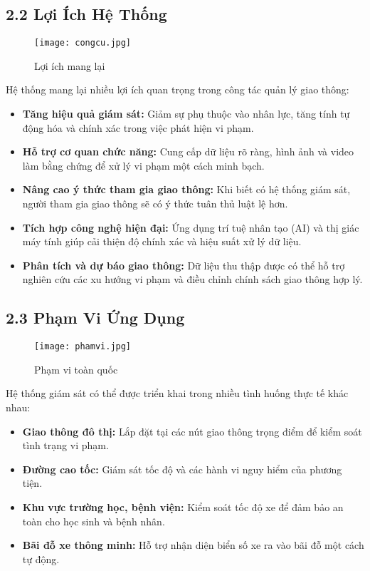 \documentclass[conference]{IEEEtran}
\begin{document}
\subsection{2.2 Lợi Ích Hệ Thống}
\begin{figure}[H]
    \centering
    \texttt{[image: congcu.jpg]} %
    \caption{Lợi ích mang lại}
    \label{fig:traffic_monitoring}
\end{figure}
Hệ thống mang lại nhiều lợi ích quan trọng trong công tác quản lý giao thông:
\begin{itemize}
    \item \textbf{Tăng hiệu quả giám sát:} Giảm sự phụ thuộc vào nhân lực, tăng tính tự động hóa và chính xác trong việc phát hiện vi phạm.
    \item \textbf{Hỗ trợ cơ quan chức năng:} Cung cấp dữ liệu rõ ràng, hình ảnh và video làm bằng chứng để xử lý vi phạm một cách minh bạch.
    \item \textbf{Nâng cao ý thức tham gia giao thông:} Khi biết có hệ thống giám sát, người tham gia giao thông sẽ có ý thức tuân thủ luật lệ hơn.
    \item \textbf{Tích hợp công nghệ hiện đại:} Ứng dụng trí tuệ nhân tạo (AI) và thị giác máy tính giúp cải thiện độ chính xác và hiệu suất xử lý dữ liệu.
    \item \textbf{Phân tích và dự báo giao thông:} Dữ liệu thu thập được có thể hỗ trợ nghiên cứu các xu hướng vi phạm và điều chỉnh chính sách giao thông hợp lý.
\end{itemize}

\subsection{2.3 Phạm Vi Ứng Dụng}
\begin{figure}[H]
    \centering
    \texttt{[image: phamvi.jpg]} %
    \caption{Phạm vi toàn quốc}
    \label{fig:traffic_monitoring}
\end{figure}
Hệ thống giám sát có thể được triển khai trong nhiều tình huống thực tế khác nhau:
\begin{itemize}
    \item \textbf{Giao thông đô thị:} Lắp đặt tại các nút giao thông trọng điểm để kiểm soát tình trạng vi phạm.
    \item \textbf{Đường cao tốc:} Giám sát tốc độ và các hành vi nguy hiểm của phương tiện.
    \item \textbf{Khu vực trường học, bệnh viện:} Kiểm soát tốc độ xe để đảm bảo an toàn cho học sinh và bệnh nhân.
    \item \textbf{Bãi đỗ xe thông minh:} Hỗ trợ nhận diện biển số xe ra vào bãi đỗ một cách tự động.
\end{itemize}
\end{document}
